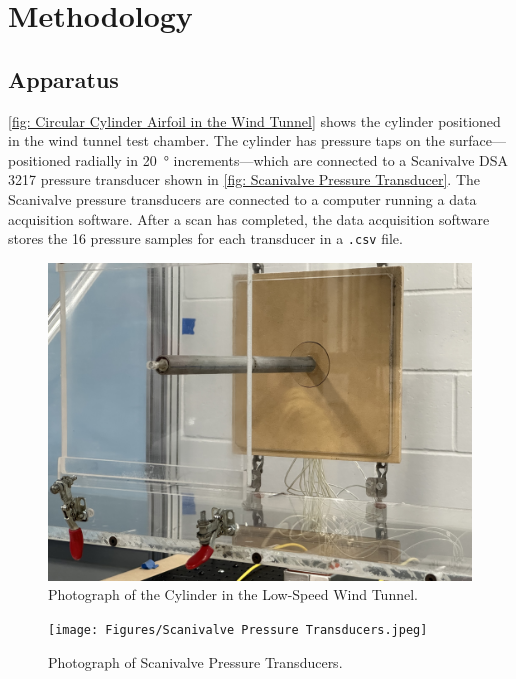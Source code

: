 \chapter{Methodology}
\label{cp:methodology}

\section{Apparatus}\label{sec:apparatus}

\autoref{fig: Circular Cylinder Airfoil in the Wind Tunnel} shows the cylinder positioned in the wind tunnel test chamber. The cylinder has pressure taps on the surface—positioned radially in \qty{20}{\degree} increments—which are connected to a Scanivalve DSA 3217 pressure transducer shown in \autoref{fig: Scanivalve Pressure Transducer}. The Scanivalve pressure transducers are connected to a computer running a data acquisition software. After a scan has completed, the data acquisition software stores the \num{16} pressure samples for each transducer in a \verb|.csv| file.

\begin{figure}[htpb]
    \centering
    \includegraphics[width=\linewidth]{Figures/Cylinder in Wind Tunnel.jpeg}
    \caption[Picture of the cylinder in the Wind Tunnel ]{Photograph of the Cylinder in the Low-Speed Wind Tunnel.}
    \label{fig: Circular Cylinder Airfoil in the Wind Tunnel}
\end{figure}

\begin{figure}[htpb]
    \centering
    \texttt{[image: Figures/Scanivalve Pressure Transducers.jpeg]}
    \caption[Picture of Scanivalve Pressure Transducers]{Photograph of Scanivalve Pressure Transducers.}
    \label{fig: Scanivalve Pressure Transducer}
\end{figure}

